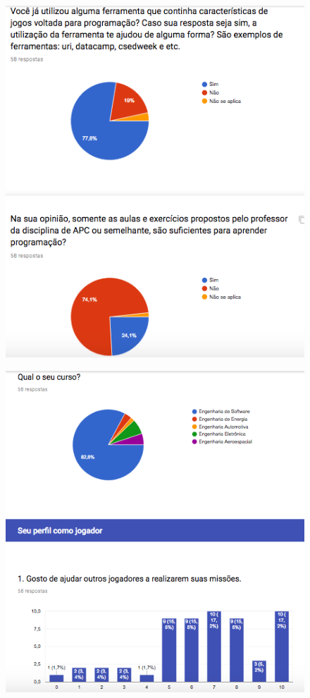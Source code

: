 \begin{apendicesenv}
\begin{figure}[h]
	\centering
	\includegraphics[keepaspectratio=true,scale=1]{figuras/r5.png}
\end{figure}

\begin{figure}[h]
	\centering
	\includegraphics[keepaspectratio=true,scale=1]{figuras/r6.png}
\end{figure}


\end{apendicesenv}
